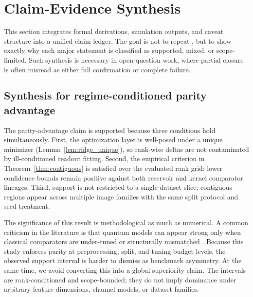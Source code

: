 \documentclass{article} %
\begin{document}
\begin{table}[t]
\caption{Bound-audit summary for non-entangling kernel emulation. Reported columns connect observed deltas, kernel error estimates, and normalized bound ratios used in the kernel-null test. The table provides direct numerical evidence for the supported status of this bounded claim and makes the caveat structure explicit for adaptive extensions.}
\label{tab:cf3}
\centering
\small
\renewcommand{\arraystretch}{1.1}
\setlength{\tabcolsep}{4pt}
\resizebox{\linewidth}{!}{}
\end{table}

\section{Claim-Evidence Synthesis}\label{sec:claim_evidence}
This section integrates formal derivations, simulation outputs, and caveat structure into a unified claim ledger. The goal is not to repeat , but to show exactly why each major statement is classified as supported, mixed, or scope-limited. Such synthesis is necessary in open-question work, where partial closure is often misread as either full confirmation or complete failure.

\subsection{Synthesis for regime-conditioned parity advantage}
The parity-advantage claim is supported because three conditions hold simultaneously. First, the optimization layer is well-posed under a unique minimizer (Lemma~\ref{lem:ridge_unique}), so rank-wise deltas are not contaminated by ill-conditioned readout fitting. Second, the empirical criterion in Theorem~\ref{thm:contiguous} is satisfied over the evaluated rank grid: lower confidence bounds remain positive against both reservoir and kernel comparator lineages. Third, support is not restricted to a single dataset slice; contiguous regions appear across multiple image families with the same split protocol and seed treatment.

The significance of this result is methodological as much as numerical. A common criticism in the literature is that quantum models can appear strong only when classical comparators are under-tuned or structurally mismatched \citep{S006,S020,S035}. Because this study enforces parity at preprocessing, split, and tuning-budget levels, the observed support interval is harder to dismiss as benchmark asymmetry. At the same time, we avoid converting this into a global superiority claim. The intervals are rank-conditioned and scope-bounded; they do not imply dominance under arbitrary feature dimensions, channel models, or dataset families.
\end{document}
